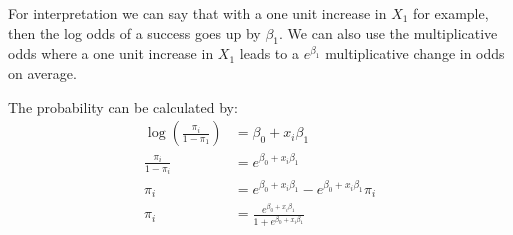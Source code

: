 For interpretation we can say that with a one unit increase in $X_1$ for example, then the log odds of a success goes up by $\beta_1$. We can also use the multiplicative odds where a one unit increase in $X_1$ leads to a $e^{\beta_1}$ multiplicative change in odds on average.

The probability can be calculated by:
\begin{equation}
\begin{split}
\log \left(\frac{\pi_i}{1-\pi_1} \right) & = \beta_0 + x_i \beta_1 \\
\frac{\pi_i}{1-\pi_i} &= e^{\beta_0 + x_i \beta_1} \\
\pi_i &= e^{\beta_0 + x_i \beta_1} - e^{\beta_0 + x_i \beta_1} \pi_i \\
\pi_i &= \frac{e^{\beta_0 + x_i \beta_1}}{1+e^{\beta_0 + x_i \beta_1}}
\end{split}
\end{equation}
